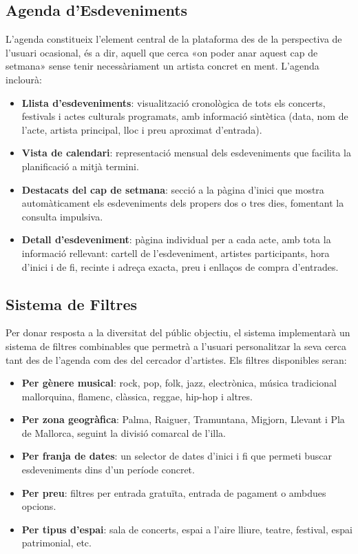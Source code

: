 \subsection{Agenda d'Esdeveniments}

L'agenda constitueix l'element central de la plataforma des de la perspectiva de l'usuari ocasional, és a dir, aquell que cerca «on poder anar aquest cap de setmana» sense tenir necessàriament un artista concret en ment. L'agenda inclourà:

\begin{itemize}
    \item \textbf{Llista d'esdeveniments}: visualització cronològica de tots els concerts, festivals i actes culturals programats, amb informació sintètica (data, nom de l'acte, artista principal, lloc i preu aproximat d'entrada).
    \item \textbf{Vista de calendari}: representació mensual dels esdeveniments que facilita la planificació a mitjà termini.
    \item \textbf{Destacats del cap de setmana}: secció a la pàgina d'inici que mostra automàticament els esdeveniments dels propers dos o tres dies, fomentant la consulta impulsiva.
    \item \textbf{Detall d'esdeveniment}: pàgina individual per a cada acte, amb tota la informació rellevant: cartell de l'esdeveniment, artistes participants, hora d'inici i de fi, recinte i adreça exacta, preu i enllaços de compra d'entrades.
\end{itemize}

\subsection{Sistema de Filtres}

Per donar resposta a la diversitat del públic objectiu, el sistema implementarà un sistema de filtres combinables que permetrà a l'usuari personalitzar la seva cerca tant des de l'agenda com des del cercador d'artistes. Els filtres disponibles seran:

\begin{itemize}
    \item \textbf{Per gènere musical}: rock, pop, folk, jazz, electrònica, música tradicional mallorquina, flamenc, clàssica, reggae, hip-hop i altres.
    \item \textbf{Per zona geogràfica}: Palma, Raiguer, Tramuntana, Migjorn, Llevant i Pla de Mallorca, seguint la divisió comarcal de l'illa.
    \item \textbf{Per franja de dates}: un selector de dates d'inici i fi que permeti buscar esdeveniments dins d'un període concret.
    \item \textbf{Per preu}: filtres per entrada gratuïta, entrada de pagament o ambdues opcions.
    \item \textbf{Per tipus d'espai}: sala de concerts, espai a l'aire lliure, teatre, festival, espai patrimonial, etc.
\end{itemize}

